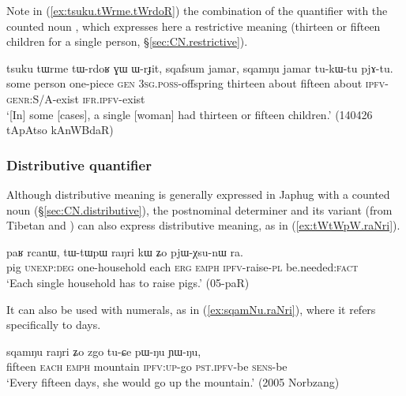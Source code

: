 Note in (\ref{ex:tsuku.tWrme.tWrdoR}) the combination of the quantifier  with the counted noun , which expresses here a restrictive meaning (thirteen or fifteen children for a single person, §\ref{sec:CN.restrictive}).

\begin{exe}
\ex \label{ex:tsuku.tWrme.tWrdoR}
\gll tsuku tɯrme tɯ-rdoʁ ɣɯ ɯ-rɟit, sqafsum jamar, sqamŋu jamar tu-kɯ-tu pjɤ-tu. \\
 some person one-piece \textsc{gen} \textsc{3sg}.\textsc{poss}-offspring thirteen about fifteen about \textsc{ipfv}-\textsc{genr}:S/A-exist \textsc{ifr}.\textsc{ipfv}-exist    \\
\glt  `[In] some [cases], a single [woman] had thirteen or fifteen children.' (140426 tApAtso kAnWBdaR)
\end{exe}
 
\subsubsection{Distributive quantifier} \label{sec:raNri}
 
 Although distributive meaning is generally expressed in Japhug with a counted noun (§\ref{sec:CN.distributive}), the postnominal determiner  and its variant  (from Tibetan  and ) can also express distributive meaning, as in (\ref{ex:tWtWpW.raNri}). 
 
\begin{exe}
\ex \label{ex:tWtWpW.raNri}
\gll paʁ rcanɯ, tɯ-tɯpɯ raŋri kɯ ʑo pjɯ-χsu-nɯ ra.\\
pig \textsc{unexp}:\textsc{deg} one-household each \textsc{erg} \textsc{emph} \textsc{ipfv}-raise-\textsc{pl} be.needed:\textsc{fact}\\
\glt `Each single household has to raise pigs.' (05-paR) 
 \end{exe}
 
 It can also be used with numerals, as in (\ref{ex:sqamNu.raNri}), where it refers specifically to days.

 \begin{exe}
\ex \label{ex:sqamNu.raNri}
\gll  sqamŋu raŋri ʑo zgo tu-ɕe pɯ-ŋu ɲɯ-ŋu, \\
fifteen \textsc{each} \textsc{emph} mountain \textsc{ipfv}:\textsc{up}-go \textsc{pst}.\textsc{ipfv}-be \textsc{sens}-be \\
\glt `Every fifteen days, she would go up the mountain.' (2005 Norbzang)
  \end{exe}

